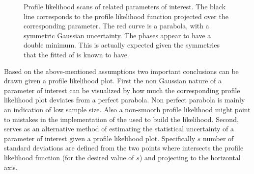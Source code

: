 \begin{figure}[!t]
  \centering
  \begin{subfigure}{0.5\textwidth}
    \raggedright
    \scalebox{0.56}{}
    \caption{}
    \label{nll_f0}
  \end{subfigure}%
  \hfill%
  \begin{subfigure}{0.5\textwidth}
    \raggedleft
    \scalebox{0.56}{}
    \caption{}
    \label{nll_fpar}
  \end{subfigure}
  \begin{subfigure}{0.5\textwidth}
    \raggedright
    \scalebox{0.56}{}
    \caption{}
    \label{nll_AparPhase}
  \end{subfigure}%
  \hfill%
  \begin{subfigure}{0.5\textwidth}
    \raggedleft
    \scalebox{0.56}{}
    \caption{}
    \label{nll_AperpPhase}
  \end{subfigure}
\caption{Profile likelihood scans of \pwave related parameters of interest. The black line corresponds to the profile likelihood
         function projected over the corresponding parameter. The red curve is a parabola, with a symmetric Gaussian
         uncertainty. The phases appear to have a double minimum. This is actually expected given the symmetries that the fitted \pdf
         of  is known to have.}
\end{figure}

Based on the above-mentioned assumptions two important conclusions can be drawn given a profile likelihood plot. First the non
Gaussian nature of a parameter of interest can be visualized by how much the corresponding profile likelihood plot deviates from
a perfect parabola. Non perfect parabola is mainly an indication of low sample
size. Also a non-smooth profile likelihood might point to mistakes in the implementation of the \pdf
used to build the likelihood. Second,  serves as an alternative method of estimating the statistical uncertainty
of a parameter of interest given a profile likelihood plot. Specifically $s$ number of standard deviations are defined from the two
points where  intersects the profile likelihood function (for the desired value of $s$) and projecting to
the horizontal axis.

